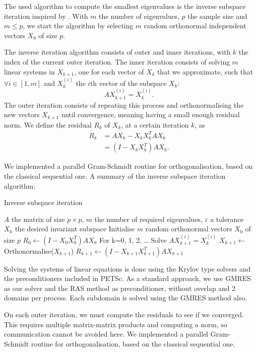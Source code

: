 The used algorithm to compute the smallest eigenvalues is the inverse subspace iteration inspired by \cite{el_khoury_acceleration_2014}.
\ifthesis
 With \(m\) the number of eigenvalues, \(p\) the sample size and \(m \le p\), we start the algorithm by selecting \(m\) random orthonormal independent vectors \(X_0\) of size \(p\).
 
 The inverse iteration algorithm consists of outer and inner iterations, with \(k\) the index of the current outer iteration.
 The inner iteration consists of solving \(m\) linear systems in \(X_{k+1}\), one for each vector of \(X_k\) that we approximate, such that \(\forall i \in [1, m]\) and \(X_k^{(i)}\) the \(i\)th vector of the subspace \(X_k\):
 \[A X_{k+1}^{(i)} = X_k^{(i)}.\]
 The outer iteration consists of repeating this process and orthonormalising the new vectors \(X_{k+1}\) until convergence, meaning having a small enough residual norm.
 We define the residual \(R_k\) of \(X_k\), at a certain iteration \(k\), as
 \begin{equation}
  \begin{split}
   R_k & = A X_k - X_k X_k^T A X_k \\
       & = (I - X_k X_k^T) A X_k.
  \end{split}
 \end{equation}

 We implemented a parallel Gram-Schmidt routine for orthogonalisation, based on the classical sequential one.
 A summary of the inverse subspace iteration algorithm:

 \begin{algorithm}[H]
  \caption{Inverse subspace iteration}
  \begin{algorithmic}
   \REQUIRE \(A\) the matrix of size \(p \times p\), \(m\) the number of required eigenvalues, \(\varepsilon\) a tolerance
   \ENSURE \(X_k\) the desired invariant subspace
   \STATE Initialise \(m\) random orthonormal vectors \(X_0\) of size \(p\)
   \STATE \(R_0 \gets (I - X_0 X_0^T) A X_0\)
   \STATE For k=0, 1, 2, \dots
     \STATE Solve \(A X_{k+1}^{(i)} = X_k^{(i)}\)
    \ENDFOR
    \STATE \(X_{k+1} \gets \) Orthonormalise(\(X_{k+1}\))
    \STATE \(R_{k+1} \gets (I - X_{k+1} X_{k+1}^T) A X_{k+1}\)
   \ENDWHILE
  \end{algorithmic}
 \end{algorithm}
\fi

Solving the systems of linear equations is done using the Krylov type solvers and the preconditioners included in PETSc.
As a standard approach, we use GMRES as our solver and the RAS method as preconditioner, without overlap and 2 domains per process.
Each subdomain is solved using the GMRES method also.

On each outer iteration, we must compute the residuals to see if we converged.
This requires multiple matrix-matrix products and computing a norm, so communication cannot be avoided here.
\ifthesis
\else
 We implemented a parallel Gram-Schmidt routine for orthogonalisation, based on the classical sequential one.
\fi
